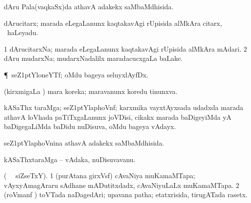 \bentry
{} 
\gl{\gu} 
\bmng
dAru Pala(vaqkaSx)da athavA adakekx saMbaMdhisida.
\emng
\eentry

\bentry
{} 
\gl{\nA}
\bmng
dArucitarx; marada eLegaLanunx kaqtakavAgi rUpisida alMkAra citarx, \kanmu\ haLeyadu.
\emng
\eentry

\bentry
{} 
\gl{\nA} 
\bmng
\bnum
\num{1} dArucitarxNa; marada  eLegaLanunx kaqtakavAgi rUpisida alMkAra mAdari. 
\num{2} dAru mudarxNa; mudarxNadalilx maradacucxgaLa baLake.
\enum
\emng
\eentry

\bentry
{} 
\gl{\nA} 
\bmng
\P\ seZ\kern1ptYloneYTf; oMdu bageya seluyxlAyfDx.
\emng
\eentry

\bentry
{} 
\gl{\gu} 
\bmng
(kirxmigaLa \vi) mara  koreka; maravanunx koredu tinunxva.
\emng 
\eentry

\bentry
{}  
\gl{\nA}
\bmng
kASaThx taraMga; seZ\kern1ptYlaphoVnf; karxmika vayxtAyxsada udadxda  marada athavA loVhada paTiTxgaLanunx joVDisi, cikakx marada baDigeyiMda yA baDigegaLiMda baDidu   nuDisuva, oMdu bageya vAdayx. \quad {}
\emng
\eentry

\bentry
{}  
\gl{\gu} 
\bmng
seZ\kern1ptYlaphoVnina athavA adakekx  saMbaMdhisida.
\emng
\eentry

\bentry
{} 
\gl{\nA}
\bmng
kASaThxtaraMga -- vAdaka, nuDisuvavanu.
\emng 
\eentry

\bentry
{}
\gl{\nA}
\bmng
(\bava\   \ucAcx\ siZseTxY).
\bnum
\num{1} (purAtana girxVsf) cAvaNiya muKamaMTapa; vAyxyAmagAraru sAdhane mADutitxdadx, cAvaNiyuLaLx muKamaMTapa. 
\num{2} (roVmanf \pArxca) toVTada naDagedAri; upavana patha; etatxrisida, tirugATada rasetx.
\enum
\emng
\eentry

%

